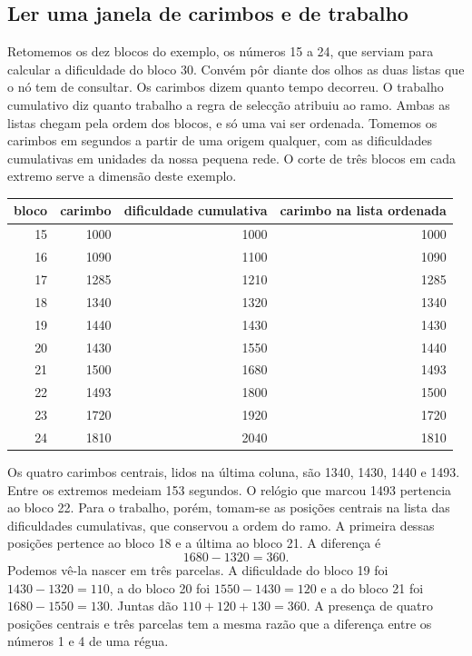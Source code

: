 \subsection{Ler uma janela de carimbos e de trabalho}
\label{subsec:exemplo-janela-dificuldade}

Retomemos os dez blocos do exemplo, os números 15 a 24, que serviam
para calcular a dificuldade do bloco 30. Convém pôr diante dos olhos as duas
listas que o nó tem de consultar. Os carimbos dizem quanto tempo decorreu.
O trabalho cumulativo diz quanto trabalho a regra de selecção atribuiu ao
ramo. Ambas as listas chegam pela ordem dos blocos, e só uma vai ser
ordenada. Tomemos os carimbos em segundos a partir de uma origem
qualquer, com as dificuldades cumulativas em unidades da nossa pequena
rede. O corte de três blocos em cada extremo serve a dimensão deste exemplo.

\begin{center}
\begin{tabular}{r|r|r|r}
bloco & carimbo & dificuldade cumulativa & carimbo na lista ordenada\\
\hline
15 & 1000 & 1000 & 1000\\
16 & 1090 & 1100 & 1090\\
17 & 1285 & 1210 & 1285\\
18 & 1340 & 1320 & 1340\\
19 & 1440 & 1430 & 1430\\
20 & 1430 & 1550 & 1440\\
21 & 1500 & 1680 & 1493\\
22 & 1493 & 1800 & 1500\\
23 & 1720 & 1920 & 1720\\
24 & 1810 & 2040 & 1810
\end{tabular}
\end{center}

Os quatro carimbos centrais, lidos na última coluna, são 1340, 1430,
1440 e 1493. Entre os extremos medeiam 153 segundos. O relógio que
marcou 1493 pertencia ao bloco 22. Para o trabalho, porém, tomam-se
as posições centrais na lista das dificuldades cumulativas, que
conservou a ordem do ramo. A primeira dessas posições pertence ao
bloco 18 e a última ao bloco 21. A diferença é
\[
 1680-1320=360.
\]
Podemos vê-la nascer em três parcelas. A dificuldade do bloco 19 foi
\(1430-1320=110\), a do bloco 20 foi \(1550-1430=120\) e a do bloco
21 foi \(1680-1550=130\). Juntas dão \(110+120+130=360\).
A presença de quatro posições centrais e três parcelas tem a mesma
razão que a diferença entre os números 1 e 4 de uma régua.


